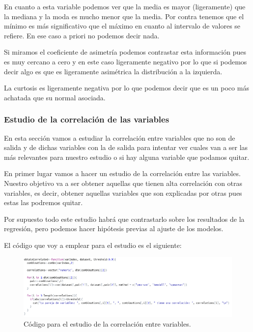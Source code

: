 \documentclass[12pt,a4paper]{article}
\begin{document}
En cuanto a esta variable podemos ver que la media es mayor (ligeramente) que la mediana y la moda es mucho menor que la media. Por contra tenemos que el mínimo es más significativo que el máximo en cuanto al intervalo de valores se refiere. En ese caso a priori no podemos decir nada.

Si miramos el coeficiente de asimetría podemos contrastar esta información pues es muy cercano a cero y en este caso ligeramente negativo por lo que si podemos decir algo es que es ligeramente asimétrica la distribución a la izquierda.

La curtosis es ligeramente negativa por lo que podemos decir que es un poco más achatada que su normal asociada.

\subsubsection{Estudio de la correlación de las variables}

En esta sección vamos a estudiar la correlación entre variables que no son de salida y de dichas variables con la de salida para intentar ver cuales van a ser las más relevantes para nuestro estudio o si hay alguna variable que podamos quitar.

En primer lugar vamos a hacer un estudio de la correlación entre las variables. Nuestro objetivo va a ser obtener aquellas que tienen alta correlación con otras variables, es decir, obtener aquellas variables que son explicadas por otras pues estas las podremos quitar.

Por supuesto todo este estudio habrá que contrastarlo sobre los resultados de la regresión, pero podemos hacer hipótesis previas al ajuste de los modelos.

El código que voy a emplear para el estudio es el siguiente:

\begin{figure}[H]
	\centering
	\includegraphics[scale=0.51]{./Imagenes/EDA/Regresion/correlacion_entre_variables_codigo.png}
	\caption{Código para el estudio de la correlación entre variables.}
\end{figure}
\end{document}
